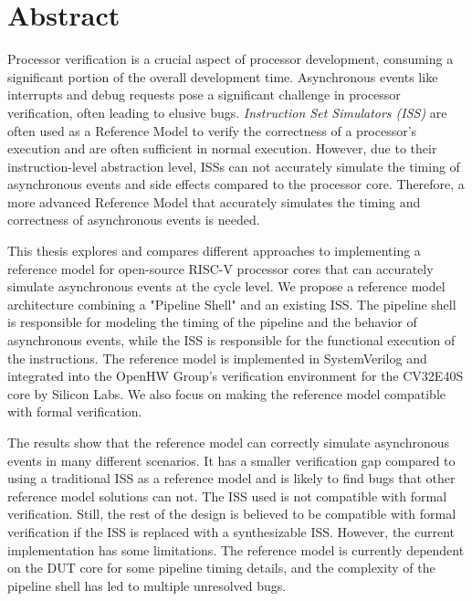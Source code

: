 \chapter*{Abstract}

Processor verification is a crucial aspect of processor development, consuming a significant portion of the overall development time.
Asynchronous events like interrupts and debug requests pose a significant challenge in processor verification, often leading to elusive bugs. 
\textit{Instruction Set Simulators (ISS)} are often used as a Reference Model to verify the correctness of a processor's execution and are often sufficient in normal execution. 
However, due to their instruction-level abstraction level, ISSs can not accurately simulate the timing of asynchronous events and side effects compared to the processor core. Therefore, a more advanced Reference Model that accurately simulates the timing and correctness of asynchronous events is needed.


This thesis explores and compares different approaches to implementing a reference model for open-source RISC-V processor cores that can accurately simulate asynchronous events at the cycle level. We propose a reference model architecture combining a "Pipeline Shell" and an existing ISS. The pipeline shell is responsible for modeling the timing of the pipeline and the behavior of asynchronous events, while the ISS is responsible for the functional execution of the instructions. The reference model is implemented in SystemVerilog and integrated into the OpenHW Group's verification environment for the CV32E40S core by Silicon Labs. We also focus on making the reference model compatible with formal verification.

The results show that the reference model can correctly simulate asynchronous events in many different scenarios. It has a smaller verification gap compared to using a traditional ISS as a reference model and is likely to find bugs that other reference model solutions can not. The ISS used is not compatible with formal verification. Still, the rest of the design is believed to be compatible with formal verification if the ISS is replaced with a synthesizable ISS. However, the current implementation has some limitations. The reference model is currently dependent on the DUT core for some pipeline timing details, and the complexity of the pipeline shell has led to multiple unresolved bugs.







